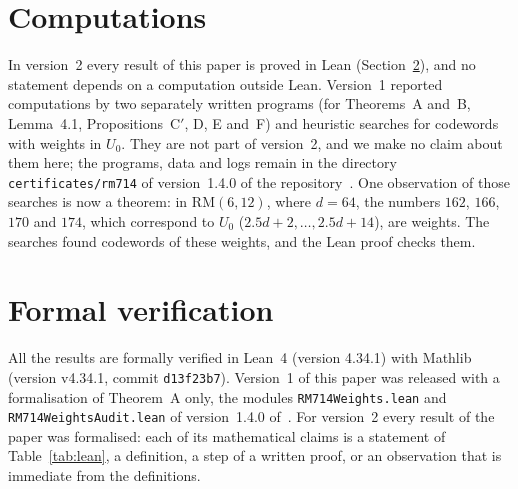 \documentclass[11pt]{article}
\theoremstyle{remark}
\newcommand{\RM}{\mathrm{RM}}
\begin{document}
\section{Computations}\label{sec:comp}
In version~2 every result of this paper is proved in Lean
(Section~\ref{sec:lean}), and no statement depends on a computation outside
Lean. Version~1 reported computations by two separately written programs (for
Theorems~A and~B, Lemma~4.1, Propositions~C$'$, D, E and~F) and heuristic
searches for codewords with weights in $U_0$. They are not
part of version~2, and we make no claim about them here; the programs, data
and logs remain in the directory \texttt{certificates/rm714} of version~1.4.0
of the repository~\cite{repo}. One observation of those searches is now a
theorem: in $\RM(6,12)$, where $d=64$, the numbers $162$, $166$, $170$ and
$174$, which correspond to $U_0$ ($2.5d+2,\dots,2.5d+14$), are weights. The
searches found codewords of these weights, and the Lean proof checks them.

\section{Formal verification}\label{sec:lean}
All the results are formally verified in Lean~4 (version 4.34.1) with
Mathlib~\cite{mathlib} (version v4.34.1, commit \texttt{d13f23b7}).
Version~1 of this paper was released with a formalisation of Theorem~A only,
the modules \texttt{RM714Weights.lean} and \texttt{RM714WeightsAudit.lean} of
version~1.4.0 of~\cite{repo}. For version~2 every result of the paper was
formalised: each of its mathematical claims is a statement of
Table~\ref{tab:lean}, a definition, a step of a written proof, or an
observation that is immediate from the definitions.
\end{document}
